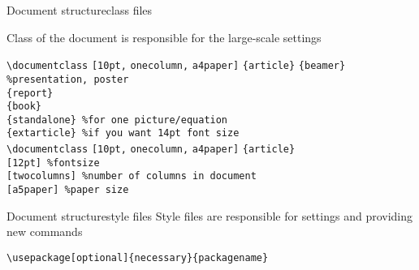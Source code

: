 \begin{frame}[fragile]{Document structure}{class files}

Class of the document is responsible for the large-scale settings
    \cprotect{} 
{
\scriptsize
\begin{tabbing}
\lstinline|\documentclass|\hspace{-1ex} \= \lstinline|[10pt,|  \= \lstinline|onecolumn,|  \=  \lstinline|a4paper]|\hspace{-1ex} \= \lstinline|{article}| \kill
\> \> \> \> \lstinline|{beamer} %presentation, poster| \\
\> \> \> \> \lstinline|{report}| \\
\> \> \> \> \lstinline|{book}| \\
\> \> \> \> \lstinline|{standalone} %for one picture/equation| \\
\> \> \> \> \lstinline|{extarticle} %if you want 14pt font size| \\
\lstinline|\documentclass| \> \lstinline|[10pt,|  \> \lstinline|onecolumn,|  \>  \lstinline|a4paper]| \> \lstinline|{article}| \\ 
\> \lstinline|[12pt] %fontsize| \> \\ 
\> \> \lstinline|[twocolumns] %number of columns in document| \> \\ 
\> \> \> \lstinline|[a5paper] %paper size| \> \\ 
\end{tabbing}}
\cprotect{}
\end{frame}

\begin{frame}[fragile]{Document structure}{style files}
     Style files are responsible for settings and providing new commands 
     
     \vfill
     \hspace{-1ex}
     \lstinline[basicstyle=\tt\large]|\usepackage[optional]{necessary}{packagename}|
     \vfill
\end{frame}

\cprotect{}

